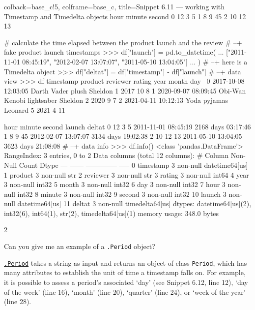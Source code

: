 \documentclass[a4paper,11pt]{book}
\newcommand{\question}[1]{%
    \begin{tcolorbox}[colback=comp_c!10,colframe=comp_c,sidebyside align=top,width=\linewidth,before skip=1ex]
        #1
    \end{tcolorbox}
    \switchcolumn%
}
\newcommand{\note}[1]{%
    \begin{tcolorbox}[colback=white!0,colframe=white!10,width=\linewidth,before skip=1ex]
        #1
    \end{tcolorbox}
}
\begin{document}
\begin{pythoncode}[linenos=True]{colback=base_c!5, colframe=base_c, title=\sffamily Snippet 6.11 --- working with Timestamp and Timedelta objects}
   hour  minute  second  
0    12       3       5  
1     8       9      45  
2    10      12      13  

# calculate the time elapsed between the product launch and the review
# --+ fake product launch timestamps
>>> df["launch"] = pd.to_datetime(
...     ["2011-11-01 08:45:19", "2012-02-07 13:07:07", "2011-05-10 13:04:05"]
...     )
# --+ here is a Timedelta object
>>> df["deltat"] = df["timestamp"] - df["launch"]
# --+ data view
>>> df
            timestamp                    product reviewer  rating  year  month  day  \
0 2017-10-08 12:03:05          Darth Vader plush  Sheldon       1  2017     10    8   
1 2020-09-07 08:09:45  Obi-Wan Kenobi lightsaber  Sheldon       2  2020      9    7   
2 2021-04-11 10:12:13               Yoda pyjamas  Leonard       5  2021      4   11   

   hour  minute  second              launch             deltat  
0    12       3       5 2011-11-01 08:45:19 2168 days 03:17:46  
1     8       9      45 2012-02-07 13:07:07 3134 days 19:02:38  
2    10      12      13 2011-05-10 13:04:05 3623 days 21:08:08  
# --+ data info
>>> df.info()
<class 'pandas.DataFrame'>
RangeIndex: 3 entries, 0 to 2
Data columns (total 12 columns):
 #   Column     Non-Null Count  Dtype          
---  ------     --------------  -----          
 0   timestamp  3 non-null      datetime64[us] 
 1   product    3 non-null      str            
 2   reviewer   3 non-null      str            
 3   rating     3 non-null      int64          
 4   year       3 non-null      int32          
 5   month      3 non-null      int32          
 6   day        3 non-null      int32          
 7   hour       3 non-null      int32          
 8   minute     3 non-null      int32          
 9   second     3 non-null      int32          
 10  launch     3 non-null      datetime64[us] 
 11  deltat     3 non-null      timedelta64[us]
dtypes: datetime64[us](2), int32(6), int64(1), str(2), timedelta64[us](1)
memory usage: 348.0 bytes
\end{pythoncode}
\clearpage

\begin{paracol}{2}
	\question{Can you give me an example of a \texttt{.Period} object?}
	\note{\href{https://pandas.pydata.org/docs/reference/api/pandas.Period.html}{\texttt{.Period}} takes a string as input and returns an object of class \texttt{Period}, which has many attributes to establish the unit of time a timestamp falls on. For example, it is possible to assess a period's associated `day' (see Snippet 6.12, line 12), `day of the week' (line 16), `month' (line 20), `quarter' (line 24), or `week of the year' (line 28).
	}
\end{paracol}
\end{document}
